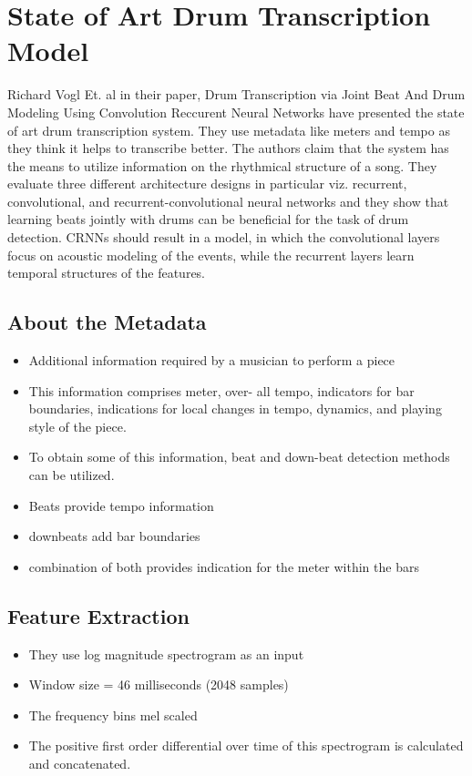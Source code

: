 \chapter{State of Art Drum Transcription Model}

Richard Vogl Et. al in their paper, Drum Transcription via Joint Beat And Drum Modeling Using Convolution Reccurent Neural Networks have presented the state of art drum transcription system. They use metadata like meters and tempo as they think it helps to transcribe better. The authors claim that the system has the means to utilize information on the rhythmical structure of a song. They evaluate three different architecture designs in particular viz. recurrent, convolutional, and recurrent-convolutional neural networks and they show that learning beats jointly with drums can be beneficial for the task of drum detection. CRNNs should result in a model, in which the convolutional layers focus on acoustic modeling of the events, while the recurrent layers learn temporal structures of the features. 


\section*{About the Metadata}
\begin{itemize}
\item Additional information required by a musician to perform a piece
\item This information comprises meter, over- all tempo, indicators for bar boundaries, indications for local changes in tempo, dynamics, and playing style of the piece. 
\item To obtain some of this information, beat and down-beat detection methods can be utilized. 
\item Beats provide tempo information
\item downbeats add bar boundaries
\item combination of both provides indication for the meter within the bars
\end{itemize}

\section*{Feature Extraction}
  
\begin{itemize}
\item They use log magnitude spectrogram as an input
\item Window size = 46 milliseconds (2048 samples)
\item The frequency bins mel scaled
\item The positive first order differential over time of this spectrogram is calculated and concatenated.
\end{itemize}  

